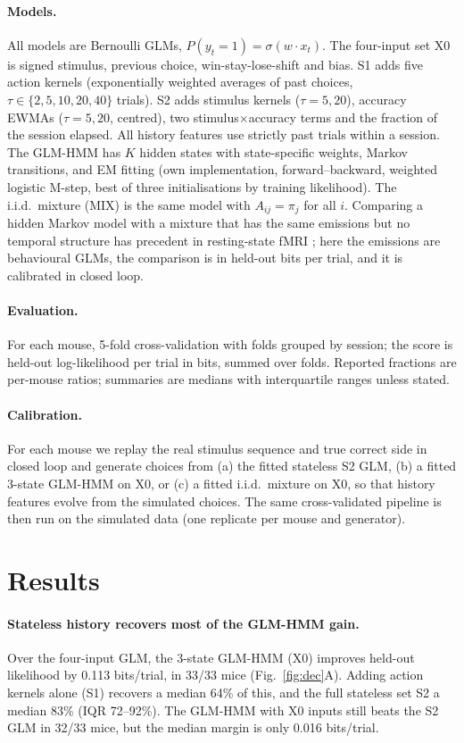 \documentclass[11pt]{article}
\begin{document}
\paragraph{Models.} All models are Bernoulli GLMs, $P(y_t=1)=\sigma(w\cdot x_t)$. The four-input set X0 is signed stimulus, previous choice, win-stay-lose-shift and bias. S1 adds five action kernels (exponentially weighted averages of past choices, $\tau\in\{2,5,10,20,40\}$ trials). S2 adds stimulus kernels ($\tau=5,20$), accuracy EWMAs ($\tau=5,20$, centred), two stimulus$\times$accuracy terms and the fraction of the session elapsed. All history features use strictly past trials within a session. The GLM-HMM has $K$ hidden states with state-specific weights, Markov transitions, and EM fitting (own implementation, forward--backward, weighted logistic M-step, best of three initialisations by training likelihood). The i.i.d.\ mixture (MIX) is the same model with $A_{ij}=\pi_j$ for all $i$. Comparing a hidden Markov model with a mixture that has the same emissions but no temporal structure has precedent in resting-state fMRI \citep{ezaki2021}; here the emissions are behavioural GLMs, the comparison is in held-out bits per trial, and it is calibrated in closed loop.

\paragraph{Evaluation.} For each mouse, 5-fold cross-validation with folds grouped by session; the score is held-out log-likelihood per trial in bits, summed over folds. Reported fractions are per-mouse ratios; summaries are medians with interquartile ranges unless stated.

\paragraph{Calibration.} For each mouse we replay the real stimulus sequence and true correct side in closed loop and generate choices from (a) the fitted stateless S2 GLM, (b) a fitted 3-state GLM-HMM on X0, or (c) a fitted i.i.d.\ mixture on X0, so that history features evolve from the simulated choices. The same cross-validated pipeline is then run on the simulated data (one replicate per mouse and generator).

\section{Results}
\paragraph{Stateless history recovers most of the GLM-HMM gain.} Over the four-input GLM, the 3-state GLM-HMM (X0) improves held-out likelihood by 0.113 bits/trial, in 33/33 mice (Fig.~\ref{fig:dec}A). Adding action kernels alone (S1) recovers a median 64\% of this, and the full stateless set S2 a median 83\% (IQR 72--92\%). The GLM-HMM with X0 inputs still beats the S2 GLM in 32/33 mice, but the median margin is only 0.016 bits/trial.
\end{document}
